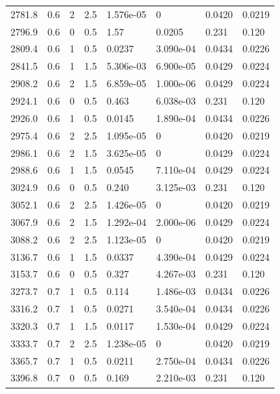\documentclass[preview]{standalone}
\begin{document}
{{{\begin{tabular}{L{1.2cm}C{1.2cm} C{0.3cm}C{0.5cm} C{1.4cm}C{1.4cm} C{1.4cm}C{1.4cm}}
  2781.8  &   0.6  & 2     & 2.5 &  1.576e-05  & 0  & 0.0420 &  0.0219   \\ 
  2796.9  &   0.6  & 0     & 0.5 &  1.57  & 0.0205  & 0.231 &  0.120   \\ 
  2809.4  &   0.6  & 1     & 0.5 &  0.0237  & 3.090e-04  & 0.0434 &  0.0226   \\ 
  2841.5  &   0.6  & 1     & 1.5 &  5.306e-03  & 6.900e-05  & 0.0429 &  0.0224   \\ 
  2908.2  &   0.6  & 2     & 1.5 &  6.859e-05  & 1.000e-06  & 0.0429 &  0.0224   \\ 
  2924.1  &   0.6  & 0     & 0.5 &  0.463  & 6.038e-03  & 0.231 &  0.120   \\ 
  2926.0  &   0.6  & 1     & 0.5 &  0.0145  & 1.890e-04  & 0.0434 &  0.0226   \\ 
  2975.4  &   0.6  & 2     & 2.5 &  1.095e-05  & 0  & 0.0420 &  0.0219   \\ 
  2986.1  &   0.6  & 2     & 1.5 &  3.625e-05  & 0  & 0.0429 &  0.0224   \\ 
  2988.6  &   0.6  & 1     & 1.5 &  0.0545  & 7.110e-04  & 0.0429 &  0.0224   \\ 
  3024.9  &   0.6  & 0     & 0.5 &  0.240  & 3.125e-03  & 0.231 &  0.120   \\ 
  3052.1  &   0.6  & 2     & 2.5 &  1.426e-05  & 0  & 0.0420 &  0.0219   \\ 
  3067.9  &   0.6  & 2     & 1.5 &  1.292e-04  & 2.000e-06  & 0.0429 &  0.0224   \\ 
  3088.2  &   0.6  & 2     & 2.5 &  1.123e-05  & 0  & 0.0420 &  0.0219   \\ 
  3136.7  &   0.6  & 1     & 1.5 &  0.0337  & 4.390e-04  & 0.0429 &  0.0224   \\ 
  3153.7  &   0.6  & 0     & 0.5 &  0.327  & 4.267e-03  & 0.231 &  0.120   \\ 
  3273.7  &   0.7  & 1     & 0.5 &  0.114  & 1.486e-03  & 0.0434 &  0.0226   \\ 
  3316.2  &   0.7  & 1     & 0.5 &  0.0271  & 3.540e-04  & 0.0434 &  0.0226   \\ 
  3320.3  &   0.7  & 1     & 1.5 &  0.0117  & 1.530e-04  & 0.0429 &  0.0224   \\ 
  3333.7  &   0.7  & 2     & 2.5 &  1.238e-05  & 0  & 0.0420 &  0.0219   \\ 
  3365.7  &   0.7  & 1     & 0.5 &  0.0211  & 2.750e-04  & 0.0434 &  0.0226   \\ 
  3396.8  &   0.7  & 0     & 0.5 &  0.169  & 2.210e-03  & 0.231 &  0.120   \\ 

\end{tabular}}}}
\end{document}
